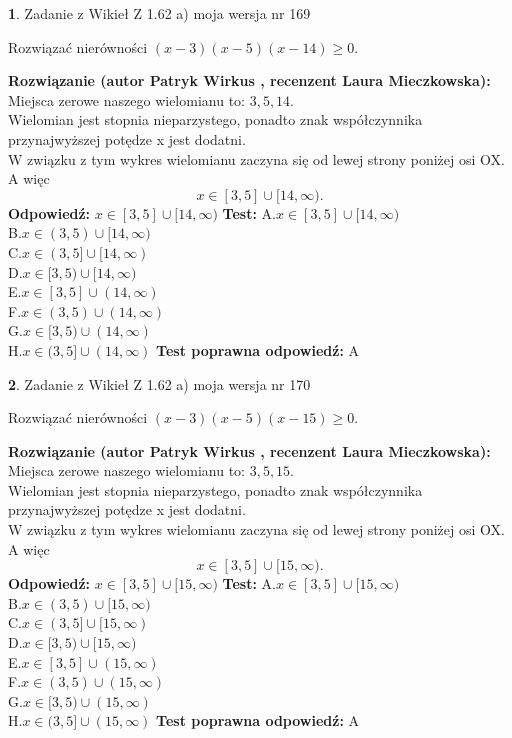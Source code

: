 \documentclass[12pt, a4paper]{article}
\theoremstyle{definition} %
\newtheorem{zad}{}
\newcommand{\zadStart}[1]{\begin{zad}#1\newline}
\newcommand{\zadStop}{\end{zad}}
\newcommand{\rozwStart}[2]{\noindent \textbf{Rozwiązanie (autor #1 , recenzent #2): }\newline}
\newcommand{\rozwStop}{\newline}
\newcommand{\odpStart}{\noindent \textbf{Odpowiedź:}\newline}
\newcommand{\odpStop}{\newline}
\newcommand{\testStart}{\noindent \textbf{Test:}\newline}
\newcommand{\testStop}{\newline}
\newcommand{\kluczStart}{\noindent \textbf{Test poprawna odpowiedź:}\newline}
\newcommand{\kluczStop}{\newline}
\begin{document}
\zadStart{Zadanie z Wikieł Z 1.62 a) moja wersja nr 169}

Rozwiązać nierówności $(x-3)(x-5)(x-14)\ge0$.
\zadStop
\rozwStart{Patryk Wirkus}{Laura Mieczkowska}
Miejsca zerowe naszego wielomianu to: $3, 5, 14$.\\
Wielomian jest stopnia nieparzystego, ponadto znak współczynnika przy\linebreak najwyższej potędze x jest dodatni.\\ W związku z tym wykres wielomianu zaczyna się od lewej strony poniżej osi OX. A więc $$x \in [3,5] \cup [14,\infty).$$
\rozwStop
\odpStart
$x \in [3,5] \cup [14,\infty)$
\odpStop
\testStart
A.$x \in [3,5] \cup [14,\infty)$\\
B.$x \in (3,5) \cup [14,\infty)$\\
C.$x \in (3,5] \cup [14,\infty)$\\
D.$x \in [3,5) \cup [14,\infty)$\\
E.$x \in [3,5] \cup (14,\infty)$\\
F.$x \in (3,5) \cup (14,\infty)$\\
G.$x \in [3,5) \cup (14,\infty)$\\
H.$x \in (3,5] \cup (14,\infty)$
\testStop
\kluczStart
A
\kluczStop



\zadStart{Zadanie z Wikieł Z 1.62 a) moja wersja nr 170}

Rozwiązać nierówności $(x-3)(x-5)(x-15)\ge0$.
\zadStop
\rozwStart{Patryk Wirkus}{Laura Mieczkowska}
Miejsca zerowe naszego wielomianu to: $3, 5, 15$.\\
Wielomian jest stopnia nieparzystego, ponadto znak współczynnika przy\linebreak najwyższej potędze x jest dodatni.\\ W związku z tym wykres wielomianu zaczyna się od lewej strony poniżej osi OX. A więc $$x \in [3,5] \cup [15,\infty).$$
\rozwStop
\odpStart
$x \in [3,5] \cup [15,\infty)$
\odpStop
\testStart
A.$x \in [3,5] \cup [15,\infty)$\\
B.$x \in (3,5) \cup [15,\infty)$\\
C.$x \in (3,5] \cup [15,\infty)$\\
D.$x \in [3,5) \cup [15,\infty)$\\
E.$x \in [3,5] \cup (15,\infty)$\\
F.$x \in (3,5) \cup (15,\infty)$\\
G.$x \in [3,5) \cup (15,\infty)$\\
H.$x \in (3,5] \cup (15,\infty)$
\testStop
\kluczStart
A
\kluczStop
\end{document}
